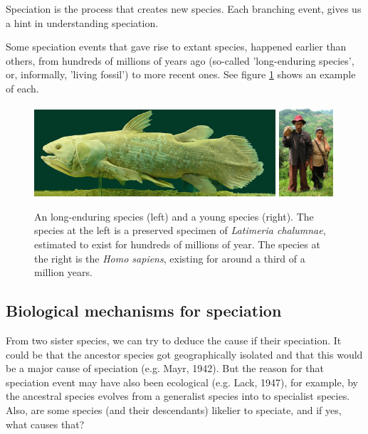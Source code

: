 {Speciation is the process that creates new species.
Each branching event, gives us a hint in understanding speciation.


Some speciation events that gave rise to extant species, 
happened earlier than others,
from hundreds of millions of years ago (so-called 'long-enduring species',
or, informally, 'living fossil') 
to more recent ones. See figure \ref{fig:long_enduring_and_young_species} 
shows an example of each.

\begin{figure}[H]
  \includegraphics[width=0.80\textwidth]{latimeria_chalumnae.jpg}
  \includegraphics[width=0.18\textwidth]{homo_sapiens.jpg}
  \caption{
    An long-enduring species (left) and a young species (right).
    The species at the left is a preserved specimen of \textit{Latimeria chalumnae}, 
    estimated to exist for hundreds of millions of year.
    The species at the right is the \textit{Homo sapiens}, 
    existing for around a third of a million years.
  }
  \label{fig:long_enduring_and_young_species}
\end{figure}

\subsection{Biological mechanisms for speciation}

From two sister species, we can try to deduce the cause
if their speciation. It could be that the ancestor species
got geographically isolated and that this would be a major
cause of speciation (e.g. Mayr, 1942). But the reason for
that speciation event may have also been ecological (e.g. Lack, 1947),
for example, by the ancestral species evolves from a generalist
species into to specialist species. Also, are some species (and their
descendants) likelier to speciate, and if yes, what causes that?

}
